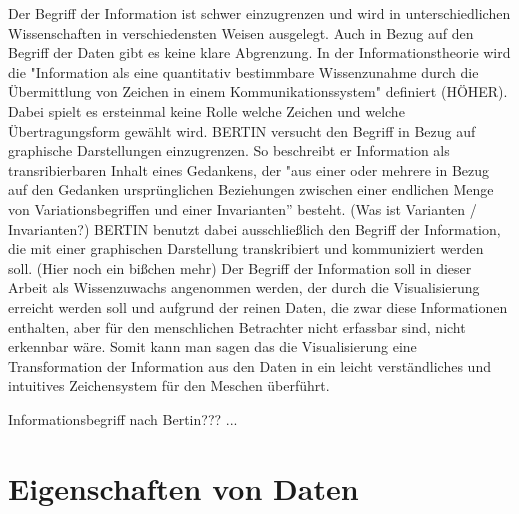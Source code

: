 \documentclass[a4paper, 12pt, onepage, pdftex, headsepline, footsepline]{scrreprt}
\begin{document}
Der Begriff der Information ist schwer einzugrenzen und wird in unterschiedlichen Wissenschaften
in verschiedensten Weisen ausgelegt. Auch in Bezug auf den Begriff der Daten gibt es keine klare Abgrenzung.
In der Informationstheorie wird die "Information als eine quantitativ
bestimmbare Wissenzunahme durch die Übermittlung von Zeichen in einem Kommunikationssystem" definiert (HÖHER).
Dabei spielt es ersteinmal keine Rolle welche Zeichen und welche Übertragungsform gewählt wird.
BERTIN versucht den Begriff in Bezug auf graphische Darstellungen einzugrenzen. So beschreibt er Information
als transribierbaren Inhalt eines Gedankens, der "aus einer oder mehrere in Bezug auf den Gedanken
ursprünglichen Beziehungen zwischen einer endlichen Menge von Variationsbegriffen und einer Invarianten” besteht.
(Was ist Varianten / Invarianten?)
BERTIN benutzt dabei ausschließlich den Begriff der Information, die mit einer graphischen Darstellung transkribiert
und kommuniziert werden soll.
(Hier noch ein bißchen mehr)
Der Begriff der Information soll in dieser Arbeit als Wissenzuwachs angenommen werden, der durch die
Visualisierung erreicht werden soll und aufgrund der reinen Daten, die zwar diese Informationen enthalten,
aber für den menschlichen Betrachter nicht erfassbar sind, nicht erkennbar wäre. Somit kann man sagen das die
Visualisierung eine Transformation der Information aus den Daten in ein leicht verständliches und intuitives
Zeichensystem für den Meschen überführt.

Informationsbegriff nach Bertin???
...

\section{Eigenschaften von Daten}
\end{document}
